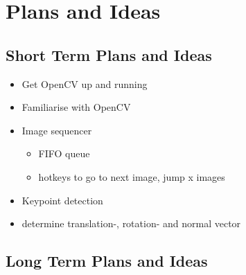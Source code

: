 \chapter{Plans and Ideas}

\section{Short Term Plans and Ideas}
\begin{itemize}
    \item Get OpenCV up and running
    \item Familiarise with OpenCV
    \item Image sequencer
    \begin{itemize}
        \item FIFO queue
        \item hotkeys to go to next image, jump x images
    \end{itemize}
    \item Keypoint detection
    \item determine translation-, rotation- and normal vector
\end{itemize}
\section{Long Term Plans and Ideas}
